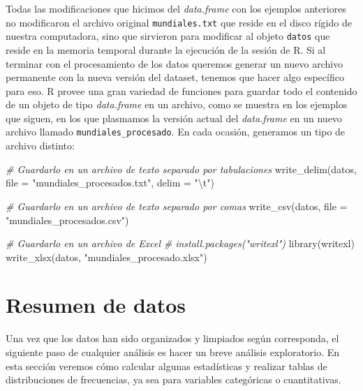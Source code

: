 \documentclass[
]{book}
\newenvironment{Shaded}{\begin{snugshade}}{\end{snugshade}}
\newcommand{\AttributeTok}[1]{\textcolor[rgb]{0.77,0.63,0.00}{#1}}
\newcommand{\CommentTok}[1]{\textcolor[rgb]{0.56,0.35,0.01}{\textit{#1}}}
\newcommand{\FunctionTok}[1]{\textcolor[rgb]{0.00,0.00,0.00}{#1}}
\newcommand{\NormalTok}[1]{#1}
\newcommand{\SpecialCharTok}[1]{\textcolor[rgb]{0.00,0.00,0.00}{#1}}
\newcommand{\StringTok}[1]{\textcolor[rgb]{0.31,0.60,0.02}{#1}}
\begin{document}
Todas las modificaciones que hicimos del \emph{data.frame} con los ejemplos anteriores no modificaron el archivo original \texttt{mundiales.txt} que reside en el disco rígido de nuestra computadora, sino que sirvieron para modificar al objeto \texttt{datos} que reside en la memoria temporal durante la ejecución de la sesión de R. Si al terminar con el procesamiento de los datos queremos generar un nuevo archivo permanente con la nueva versión del dataset, tenemos que hacer algo específico para eso. R provee una gran variedad de funciones para guardar todo el contenido de un objeto de tipo \emph{data.frame} en un archivo, como se muestra en los ejemplos que siguen, en los que plasmamos la versión actual del \emph{data.frame} en un nuevo archivo llamado \texttt{mundiales\_procesado}. En cada ocasión, generamos un tipo de archivo distinto:

\begin{Shaded}
\begin{Highlighting}[]
\CommentTok{\# Guardarlo en un archivo de texto separado por tabulaciones}
\FunctionTok{write\_delim}\NormalTok{(datos, }\AttributeTok{file =} \StringTok{"mundiales\_procesados.txt"}\NormalTok{, }\AttributeTok{delim =} \StringTok{"}\SpecialCharTok{\textbackslash{}t}\StringTok{"}\NormalTok{)}

\CommentTok{\# Guardarlo en un archivo de texto separado por comas}
\FunctionTok{write\_csv}\NormalTok{(datos, }\AttributeTok{file =} \StringTok{"mundiales\_procesados.csv"}\NormalTok{)}

\CommentTok{\# Guardarlo en un archivo de Excel}
\CommentTok{\# install.packages("writexl")}
\FunctionTok{library}\NormalTok{(writexl)}
\FunctionTok{write\_xlsx}\NormalTok{(datos, }\StringTok{"mundiales\_procesado.xlsx"}\NormalTok{)}
\end{Highlighting}
\end{Shaded}

\hypertarget{resumen-de-datos}{%
\section{Resumen de datos}\label{resumen-de-datos}}

Una vez que los datos han sido organizados y limpiados según corresponda, el siguiente paso de cualquier análisis es hacer un breve análisis exploratorio. En esta sección veremos cómo calcular algunas estadísticas y realizar tablas de distribuciones de frecuencias, ya sea para variables categóricas o cuantitativas.
\end{document}
